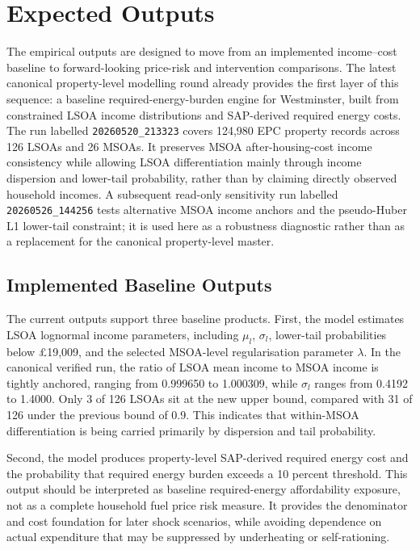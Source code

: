\section{Expected Outputs}

The empirical outputs are designed to move from an implemented income--cost baseline to forward-looking price-risk and intervention comparisons. The latest canonical property-level modelling round already provides the first layer of this sequence: a baseline required-energy-burden engine for Westminster, built from constrained LSOA income distributions and SAP-derived required energy costs. The run labelled \texttt{20260520\_213323} covers 124,980 EPC property records across 126 LSOAs and 26 MSOAs. It preserves MSOA after-housing-cost income consistency while allowing LSOA differentiation mainly through income dispersion and lower-tail probability, rather than by claiming directly observed household incomes. A subsequent read-only sensitivity run labelled \texttt{20260526\_144256} tests alternative MSOA income anchors and the pseudo-Huber L1 lower-tail constraint; it is used here as a robustness diagnostic rather than as a replacement for the canonical property-level master.

\subsection{Implemented Baseline Outputs}

The current outputs support three baseline products. First, the model estimates LSOA lognormal income parameters, including $\mu_l$, $\sigma_l$, lower-tail probabilities below \pounds 19{,}009, and the selected MSOA-level regularisation parameter $\lambda$. In the canonical verified run, the ratio of LSOA mean income to MSOA income is tightly anchored, ranging from 0.999650 to 1.000309, while $\sigma_l$ ranges from 0.4192 to 1.4000. Only 3 of 126 LSOAs sit at the new upper bound, compared with 31 of 126 under the previous bound of 0.9. This indicates that within-MSOA differentiation is being carried primarily by dispersion and tail probability.

Second, the model produces property-level SAP-derived required energy cost and the probability that required energy burden exceeds a 10 percent threshold. This output should be interpreted as baseline required-energy affordability exposure, not as a complete household fuel price risk measure. It provides the denominator and cost foundation for later shock scenarios, while avoiding dependence on actual expenditure that may be suppressed by underheating or self-rationing.

